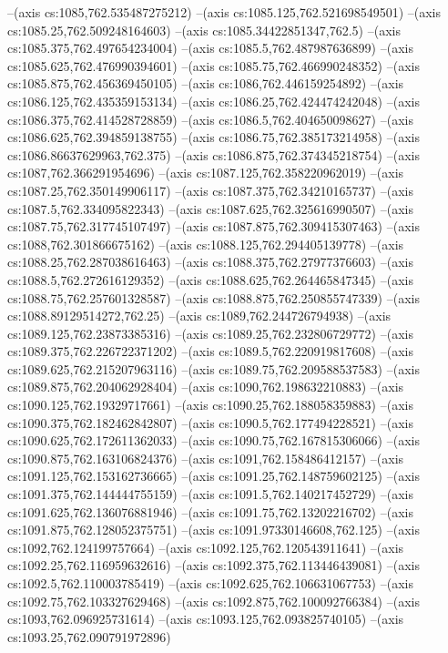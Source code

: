 --(axis cs:1085,762.535487275212)
--(axis cs:1085.125,762.521698549501)
--(axis cs:1085.25,762.509248164603)
--(axis cs:1085.34422851347,762.5)
--(axis cs:1085.375,762.497654234004)
--(axis cs:1085.5,762.487987636899)
--(axis cs:1085.625,762.476990394601)
--(axis cs:1085.75,762.466990248352)
--(axis cs:1085.875,762.456369450105)
--(axis cs:1086,762.446159254892)
--(axis cs:1086.125,762.435359153134)
--(axis cs:1086.25,762.424474242048)
--(axis cs:1086.375,762.414528728859)
--(axis cs:1086.5,762.404650098627)
--(axis cs:1086.625,762.394859138755)
--(axis cs:1086.75,762.385173214958)
--(axis cs:1086.86637629963,762.375)
--(axis cs:1086.875,762.374345218754)
--(axis cs:1087,762.366291954696)
--(axis cs:1087.125,762.358220962019)
--(axis cs:1087.25,762.350149906117)
--(axis cs:1087.375,762.34210165737)
--(axis cs:1087.5,762.334095822343)
--(axis cs:1087.625,762.325616990507)
--(axis cs:1087.75,762.317745107497)
--(axis cs:1087.875,762.309415307463)
--(axis cs:1088,762.301866675162)
--(axis cs:1088.125,762.294405139778)
--(axis cs:1088.25,762.287038616463)
--(axis cs:1088.375,762.27977376603)
--(axis cs:1088.5,762.272616129352)
--(axis cs:1088.625,762.264465847345)
--(axis cs:1088.75,762.257601328587)
--(axis cs:1088.875,762.250855747339)
--(axis cs:1088.89129514272,762.25)
--(axis cs:1089,762.244726794938)
--(axis cs:1089.125,762.23873385316)
--(axis cs:1089.25,762.232806729772)
--(axis cs:1089.375,762.226722371202)
--(axis cs:1089.5,762.220919817608)
--(axis cs:1089.625,762.215207963116)
--(axis cs:1089.75,762.209588537583)
--(axis cs:1089.875,762.204062928404)
--(axis cs:1090,762.198632210883)
--(axis cs:1090.125,762.19329717661)
--(axis cs:1090.25,762.188058359883)
--(axis cs:1090.375,762.182462842807)
--(axis cs:1090.5,762.177494228521)
--(axis cs:1090.625,762.172611362033)
--(axis cs:1090.75,762.167815306066)
--(axis cs:1090.875,762.163106824376)
--(axis cs:1091,762.158486412157)
--(axis cs:1091.125,762.153162736665)
--(axis cs:1091.25,762.148759602125)
--(axis cs:1091.375,762.144444755159)
--(axis cs:1091.5,762.140217452729)
--(axis cs:1091.625,762.136076881946)
--(axis cs:1091.75,762.13202216702)
--(axis cs:1091.875,762.128052375751)
--(axis cs:1091.97330146608,762.125)
--(axis cs:1092,762.124199757664)
--(axis cs:1092.125,762.120543911641)
--(axis cs:1092.25,762.116959632616)
--(axis cs:1092.375,762.113446439081)
--(axis cs:1092.5,762.110003785419)
--(axis cs:1092.625,762.106631067753)
--(axis cs:1092.75,762.103327629468)
--(axis cs:1092.875,762.100092766384)
--(axis cs:1093,762.096925731614)
--(axis cs:1093.125,762.093825740105)
--(axis cs:1093.25,762.090791972896)
